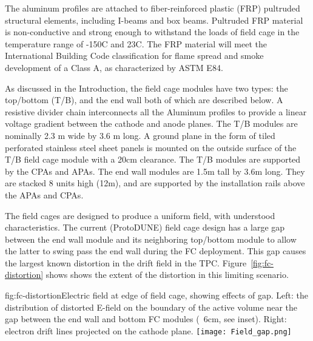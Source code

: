The aluminum profiles are attached to fiber-reinforced plastic (FRP) pultruded structural elements, including I-beams and box beams.  
Pultruded FRP material is non-conductive and strong enough to withstand the loads of field cage in the temperature range of -150C and 23C.
The FRP material will meet the International Building Code classification for flame spread and smoke development of a Class A, as characterized by ASTM E84.  


As discussed in the Introduction, the field cage modules have two types: the top/bottom (T/B), and the end wall both of which are described below. 
A resistive divider chain interconnects all the Aluminum profiles to provide a linear voltage gradient between the cathode and anode planes.  The T/B modules are nominally 2.3 m wide by 3.6 m long. A ground plane in the form of tiled perforated stainless steel sheet panels is mounted on the outside surface of the T/B field cage module with a 20cm clearance. The T/B modules are supported by the CPAs and APAs. The end wall modules are 1.5m tall by 3.6m long. They are stacked 8 units high (12m), and are supported by the installation rails above the APAs and CPAs.

The field cages are designed to produce a uniform field, with understood characteristics.
The current (ProtoDUNE) field cage design has a large gap between the end wall module and its neighboring top/bottom module to allow the latter to swing pass the end wall during the FC deployment. This gap causes the largest known distortion in the drift field in the TPC. Figure~\ref{fig:fc-distortion} shows shows the extent of the distortion in this limiting scenario.

\begin{dunefigure}{fig:fc-distortion}{Electric field at edge of field cage, showing effects of gap. Left: the distribution of distorted E-field on the boundary of the active volume near the gap between the end wall and bottom FC modules (~6cm, see inset).  Right: electron drift lines projected on the cathode plane. }
\texttt{[image: Field\_gap.png]}
\end{dunefigure}

